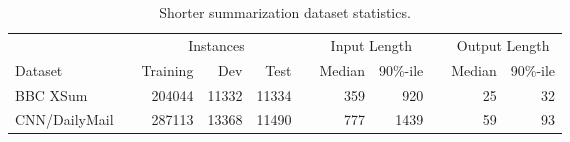 \begin{table}
    \small
    \centering
    \begin{tabular}{@{}lrrrrrrrrrr@{}}
    \toprule
    & & \multicolumn{3}{c}{Instances} & & \multicolumn{2}{c}{Input Length}& & \multicolumn{2}{c}{Output  Length} \\
    \cmidrule{3-5} \cmidrule{7-8} \cmidrule{10-11}
    Dataset & & Training & Dev & Test & & Median & 90\%-ile & &  Median & 90\%-ile \\
    \midrule
       BBC XSum \citep{narayan2018don}  & &     204044 & 11332 & 11334 & &  359 & 920 & & 25 & 32 \\
       CNN/DailyMail  \citep{hermann2015teaching} & &  287113 & 13368 & 11490 & &   777 & 1439 & & 59 & 93 \\
    \bottomrule
    \end{tabular}
    \vspace{2mm}
    \caption{Shorter summarization dataset statistics.}
    \label{tab:sum_data}
\end{table}

